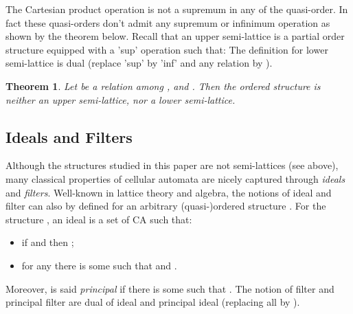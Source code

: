 \documentclass[a4paper]{elsarticle}
\def\qed{\relax\ifmmode\hskip2em \blacksquare\else\unskip\nobreak\hfill\hskip1em \fi}
\newtheorem{thm}{Theorem}[section]
\begin{document}
The Cartesian product operation is not a supremum in any of the
quasi-order.  In fact these quasi-orders don't admit any supremum or
infinimum operation as shown by the theorem below. Recall that an
upper semi-lattice is a partial order structure  equipped with a
'sup' operation such that:
 The
definition for lower semi-lattice is dual (replace 'sup' by 'inf' and
any relation  by ).

\begin{thm}
  \label{thm:noshishi}
  Let  be a relation among ,  and
  . Then the ordered structure  is neither an upper semi-lattice, nor a lower
  semi-lattice.
\end{thm}


\subsection{Ideals and Filters}
\label{sec:idfi}

Although the structures  studied in this paper
are not semi-lattices (see above), many classical properties of
cellular automata are nicely captured through \emph{ideals} and
\emph{filters}. Well-known in lattice theory and algebra, the notions
of ideal and filter can also by defined for an arbitrary
(quasi-)ordered structure \cite{lattice}. For the structure
, an ideal  is a set of CA such that:
\begin{itemize}
\item if  and  then ;
\item for any  there is some  such that
   and .
\end{itemize}
Moreover,  is said \emph{principal} if there is some  such
that .  The notion of filter and
principal filter are dual of ideal and principal ideal (replacing all
 by ).
\end{document}
